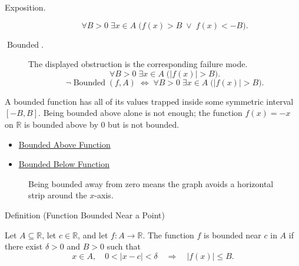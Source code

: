 \begin{remark*}
\begin{description}
  \item[Exposition.]
\[
  \forall B>0\;\exists x\in A\;
  \bigl(f(x)>B\;\vee\;f(x)<-B\bigr).
\]


  \item[\(\operatorname{Bounded}.\)]
  The displayed obstruction is the corresponding failure mode.
  \[
  \forall B>0\;\exists x\in A\;\bigl(|f(x)|>B\bigr).
\]
  \[
  \neg\operatorname{Bounded}(f,A)
  \;\Longleftrightarrow\;
  \forall B>0\;\exists x\in A\;\bigl(|f(x)|>B\bigr).
\]
\end{description}
\end{remark*}

\begin{remark*}[Interpretation]
A bounded function has all of its values trapped inside some symmetric
interval $[-B,B]$.  Being bounded above alone is not enough; the function
$f(x)=-x$ on $\mathbb{R}$ is bounded above by $0$ but is not bounded.
\end{remark*}

\begin{dependencies}
\begin{itemize}
  \item \hyperref[def:function-bounded-above]{Bounded Above Function}
  \item \hyperref[def:function-bounded-below]{Bounded Below Function}
\end{itemize}
\end{dependencies}

\begin{figure}[htbp]
\centering

\caption{Being bounded away from zero means the graph avoids a horizontal strip around the \(x\)-axis.}
\label{fig:bounded-away-zero}
\end{figure}

\begin{definitionbox}{Definition (Function Bounded Near a Point)}
\begin{definition}
\label{def:function-bounded-near-point}
Let \(A\subseteq\mathbb{R}\), let \(c\in\mathbb{R}\), and let
\(f:A\to\mathbb{R}\).  The function \(f\) is bounded near \(c\) in \(A\)
if there exist \(\delta>0\) and \(B>0\) such that
\[
  x\in A,\quad 0<|x-c|<\delta
  \quad\Longrightarrow\quad
  |f(x)|\leq B.
\]
\end{definition}
\end{definitionbox}

